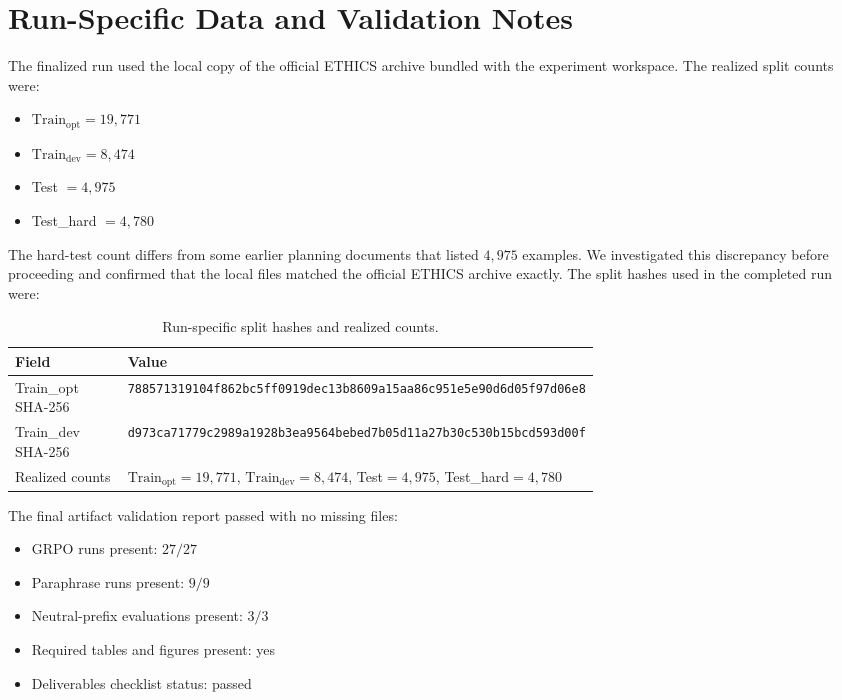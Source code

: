 \documentclass[preprint]{article}
\newcommand{\Trainopt}{\text{Train}_{\text{opt}}}
\newcommand{\Traindev}{\text{Train}_{\text{dev}}}
\begin{document}
\section{Run-Specific Data and Validation Notes}
\label{app:data_validation}

The finalized run used the local copy of the official ETHICS archive bundled with the experiment workspace.
The realized split counts were:

\begin{itemize}
    \item $\Trainopt = 19{,}771$
    \item $\Traindev = 8{,}474$
    \item Test $= 4{,}975$
    \item Test\_hard $= 4{,}780$
\end{itemize}

The hard-test count differs from some earlier planning documents that listed $4{,}975$ examples.
We investigated this discrepancy before proceeding and confirmed that the local files matched the official ETHICS archive exactly.
The split hashes used in the completed run were:

\begin{table}[h]
\centering
\caption{Run-specific split hashes and realized counts.}
\label{tab:split_hashes}
\small
\begin{tabular}{lp{0.68\linewidth}}
\toprule
Field & Value \\
\midrule
Train\_opt SHA-256 & \texttt{788571319104f862bc5ff0919dec13b8609a15aa86c951e5e90d6d05f97d06e8} \\
Train\_dev SHA-256 & \texttt{d973ca71779c2989a1928b3ea9564bebed7b05d11a27b30c530b15bcd593d00f} \\
Realized counts & $\Trainopt=19{,}771$, $\Traindev=8{,}474$, Test$=4{,}975$, Test\_hard$=4{,}780$ \\
\bottomrule
\end{tabular}
\end{table}

The final artifact validation report passed with no missing files:

\begin{itemize}
    \item GRPO runs present: $27/27$
    \item Paraphrase runs present: $9/9$
    \item Neutral-prefix evaluations present: $3/3$
    \item Required tables and figures present: yes
    \item Deliverables checklist status: passed
\end{itemize}
\end{document}
